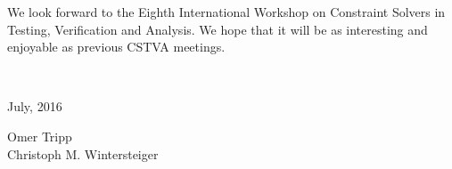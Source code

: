 We look forward to the Eighth International Workshop on Constraint Solvers in
Testing, Verification and Analysis. We hope that it will be as interesting and
enjoyable as previous CSTVA meetings. 

~\bigskip

\noindent
\begin{minipage}[t]{.4\textwidth}
July, 2016
\end{minipage}%
\hfill
\begin{minipage}[t]{.4\textwidth}\flushright
Omer Tripp\\
Christoph M. Wintersteiger
\end{minipage}

